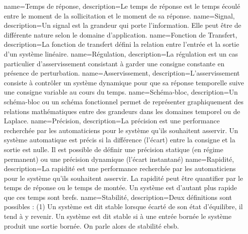 %
{%
  name={Temps de réponse},%
  description={Le temps de réponse est le temps écoulé entre le moment de 
  la sollicitation et le moment de sa réponse.
  }
}
%
{%
  name={Signal},%
  description={Un signal est la grandeur qui porte l'information. Elle peut être
  de différente nature selon le domaine d'application.
  }
}
%
{%
  name={Fonction de Transfert},%
  description={La fonction de transfert défini la relation
  entre l'entrée et la sortie d'un système linéaire.
  }
}
%
{%
  name={Régulation},%
  description={La régulation est un cas particulier d'asservissement 
  consistant à garder une consigne constante en présence de perturbation.}
}
%
{%
  name={Asservissement},%
  description={L’asservissement consiste à contrôler un système dynamique
  pour que sa réponse temporelle suive une consigne variable au cours du 
  temps.
  }
}
%
{%
  name={Schéma-bloc},%
  description={Un schéma-bloc ou un schéma fonctionnel permet de 
  représenter graphiquement des relations mathématiques entre des grandeurs
  dans les domaines temporel ou de Laplace.
  }
}
%
{%
  name={Précision},%
  description={La précision est une performance recherchée par les automaticiens
  pour le système qu'ils souhaitent asservir. 
  Un système automatique est précis si la différence (l'écart) entre la 
  consigne et la sortie est nulle. Il est possible de définir une précision 
  statique (en régime permanent) ou une précision dynamique (l'écart instantané)
  }
}
%
{%
  name={Rapidité},%
  description={La rapidité est une performance recherchée par les automaticiens 
  pour le système qu'ils souhaitent asservir. 
  La rapidité peut être quantifier par le temps de réponse 
  ou le temps de montée. Un système est d'autant plus rapide que ces temps sont
  brefs.
  }
}
%
{%
  name={Stabilité},%
  description={Deux définitions sont possibles : (1) 
  Un système est dit stable lorsque écarté de son état d'équilibre, 
  il tend à y revenir. Un système est dit stable si à une entrée bornée 
  le système produit une sortie bornée. On parle alors de stabilité \gls{ebsb}.
  }
}
